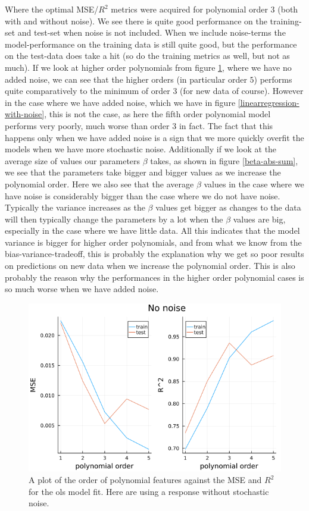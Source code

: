 \documentclass{article}
\begin{document}
Where the optimal MSE/$R^2$ metrics were acquired for polynomial order $3$ (both
with and without noise). We see there is quite good performance on the
training-set and test-set when noise is not included. When we include
noise-terms the model-performance on the training data is still quite good, but
the performance on the test-data does take a hit (so do the training metrics
as well, but not as much). If we look at higher order polynomials from figure
\ref{linearregression-no-noise}, where we have no added noise, we can see that
the higher orders (in particular order $5$) performs quite comparatively to the
minimum of order $3$ (for new data of course).  However in the case where we
have added noise, which we have in figure \ref{linearregression-with-noise},
this is not the case, as here the fifth order polynomial model performs very poorly,
much worse than order $3$ in fact. The fact that this happens only when we have
added noise is a sign that we more quickly overfit the models when we have more
stochastic noise.  Additionally if we look at the average size of values our
parameters $\beta$ takes, as shown in figure \ref{beta-abs-sum}, we see that the
parameters take bigger and bigger values as we increase the polynomial order.
Here we also see that the average $\beta$ values in the case where we have noise
is considerably bigger than the case where we do not have noise. Typically the
variance increases as the $\beta$ values get bigger as changes to the data will
then typically change the parameters by a lot when the $\beta$ values are big,
especially in the case where we have little data. All this indicates that the
model variance is bigger for higher order polynomials, and from what we know
from the bias-variance-tradeoff, this is probably the explanation why we get so
poor results on predictions on new data when we increase the polynomial order.
This is also probably the reason why the performances in the higher order
polynomial cases is so much worse when we have added noise.

\begin{figure}
    \centerline{\includegraphics[scale=0.5]{linearregression_no_noise}}
    \caption{A plot of the order of polynomial features against the MSE and $R^2$ for the ols model fit. Here are using a response without stochastic noise.}
    \label{linearregression-no-noise}
\end{figure}
\end{document}

